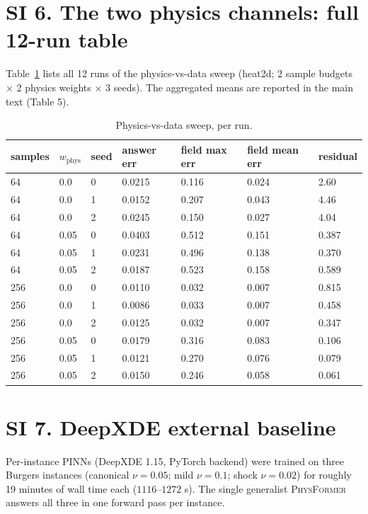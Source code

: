 \documentclass[11pt,a4paper]{article}
\newcommand{\PT}{{\scshape PhysFormer}}
\begin{document}
\section*{SI 6. The two physics channels: full 12-run table}
\label{si:channels}

Table~\ref{tab:si6} lists all 12 runs of the physics-vs-data sweep
(heat2d; 2 sample budgets $\times$ 2 physics weights $\times$ 3 seeds). The
aggregated means are reported in the main text (Table 5).

\begin{table}[h]
\centering
\caption{Physics-vs-data sweep, per run.}
\label{tab:si6}
\small
\begin{tabular}{@{}lllllll@{}}
\toprule
samples & $w_{\mathrm{phys}}$ & seed & answer err & field max err & field mean err & residual \\
\midrule
64 & 0.0 & 0 & 0.0215 & 0.116 & 0.024 & 2.60 \\
64 & 0.0 & 1 & 0.0152 & 0.207 & 0.043 & 4.46 \\
64 & 0.0 & 2 & 0.0245 & 0.150 & 0.027 & 4.04 \\
64 & 0.05 & 0 & 0.0403 & 0.512 & 0.151 & 0.387 \\
64 & 0.05 & 1 & 0.0231 & 0.496 & 0.138 & 0.370 \\
64 & 0.05 & 2 & 0.0187 & 0.523 & 0.158 & 0.589 \\
256 & 0.0 & 0 & 0.0110 & 0.032 & 0.007 & 0.815 \\
256 & 0.0 & 1 & 0.0086 & 0.033 & 0.007 & 0.458 \\
256 & 0.0 & 2 & 0.0125 & 0.032 & 0.007 & 0.347 \\
256 & 0.05 & 0 & 0.0179 & 0.316 & 0.083 & 0.106 \\
256 & 0.05 & 1 & 0.0121 & 0.270 & 0.076 & 0.079 \\
256 & 0.05 & 2 & 0.0150 & 0.246 & 0.058 & 0.061 \\
\bottomrule
\end{tabular}
\end{table}

\section*{SI 7. DeepXDE external baseline}
\label{si:deepxde}

Per-instance PINNs (DeepXDE 1.15, PyTorch backend) were trained on three
Burgers instances (canonical $\nu=0.05$; mild $\nu=0.1$; shock $\nu=0.02$)
for roughly 19 minutes of wall time each ($1116$--$1272$ s). The single
generalist \PT{} answers all three in one forward pass per instance.
\end{document}

